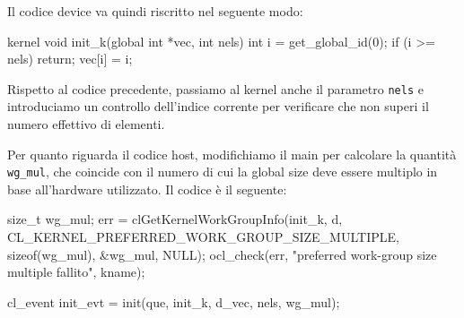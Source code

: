 Il codice device va quindi riscritto nel seguente modo:
\begin{code}[caption={Scelta della preferred global size - codice device}, label={code:preferred_global_size_device}]
    kernel void init_k(global int *vec, int nels)
    {
        int i = get_global_id(0);
        if (i >= nels) return;
        vec[i] = i;
    }
\end{code}

Rispetto al codice precedente, passiamo al kernel anche il parametro \texttt{nels} e introduciamo un controllo dell'indice corrente per verificare che non superi il numero effettivo di elementi.

Per quanto riguarda il codice host, modifichiamo il main per calcolare la quantità \texttt{wg\_mul}, che coincide con il numero di cui la global size deve essere multiplo in base all'hardware utilizzato. Il codice è il seguente:

\begin{code}[caption={Scelta della preferred global size - codice host (main)}, label={code:preferred_global_size_host_main}]
	size_t wg_mul;
	err = clGetKernelWorkGroupInfo(init_k, d, 
            CL_KERNEL_PREFERRED_WORK_GROUP_SIZE_MULTIPLE, sizeof(wg_mul), &wg_mul, NULL);
	ocl_check(err, "preferred work-group size multiple fallito", kname);

	cl_event init_evt = init(que, init_k, d_vec, nels, wg_mul);
\end{code}

